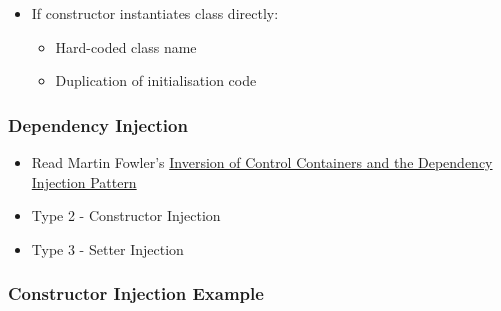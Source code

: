 \begin{itemize}
\tightlist
\item
  If constructor instantiates class directly:

  \begin{itemize}
  \tightlist
  \item
    Hard-coded class name
  \item
    Duplication of initialisation code
  \end{itemize}
\end{itemize}

\hypertarget{dependency-injection-1}{%
\subsubsection{Dependency Injection}\label{dependency-injection-1}}

\begin{itemize}
\tightlist
\item
  Read Martin Fowler's
  \href{http://www.martinfowler.com/articles/injection.html}{Inversion
  of Control Containers and the Dependency Injection Pattern}
\item
  Type 2 - Constructor Injection
\item
  Type 3 - Setter Injection
\end{itemize}

\hypertarget{constructor-injection-example}{%
\subsubsection{Constructor Injection
Example}\label{constructor-injection-example}}

\begin{Shaded}
\begin{Highlighting}[]

\NormalTok{\};}

\NormalTok{:}
\NormalTok{  : }
\NormalTok{  \{}
\NormalTok{  \}}

\NormalTok{:}
\NormalTok{;}
\NormalTok{\};}

\NormalTok{\{}
\NormalTok{\}}

\end{Highlighting}
\end{Shaded}

